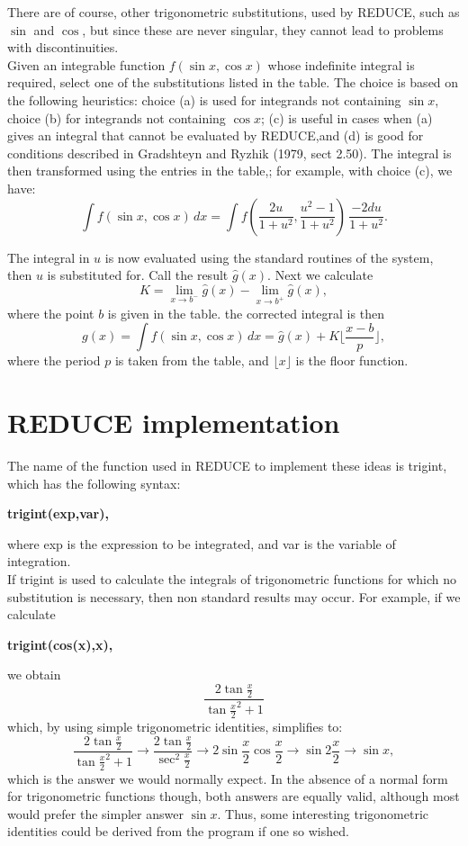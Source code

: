 There are of course, other trigonometric substitutions, used by \small{REDUCE}, \normalsize such as $\sin$ and $\cos$, but since these are never singular, they cannot lead to problems with discontinuities. \\
Given an integrable function $f(\sin x,\cos x)$ whose indefinite integral is required, select one of the substitutions listed in the table. The choice is based on the following heuristics: choice (a) is used for integrands not containing $\sin x$, choice (b) for integrands not containing $\cos x$; (c) is useful in cases when (a) gives an integral that cannot be evaluated by \small{REDUCE},\normalsize and (d) is good for conditions described in Gradshteyn and Ryzhik (1979, sect 2.50). The integral is then transformed using the entries in the table,; for example, with choice (c), we have:
\[ \int f(\sin x,\cos x)\, dx = \int f(\frac{2u}{1+u^{2}},\frac{u^{2}-1}{1+u^{2}})\,\frac{-2 du}{1+u^{2}} . \]

The integral in $u$ is now evaluated using the standard routines of the system, then $u$ is substituted for. Call the result $\hat{g}(x)$. Next we calculate
 \[ K=\lim_{x \rightarrow b^{-}} \hat{g}(x) - \lim_{x \rightarrow b^{+}} \hat{g}(x), \]
where the point $b$ is given in the table. the corrected integral is then
\[ g(x)=\int f(\sin x,\cos x)\,dx = \hat{g}(x)+K\lfloor \frac{x-b}{p} \rfloor, \]
where the period $p$ is taken from the table, and $\lfloor x \rfloor$ is the floor function.
\pagebreak
\section{REDUCE implementation}
The name of the function used in \small{REDUCE} \normalsize to implement these ideas is trigint, which has the following syntax:
\begin{center}  \bf{trigint(exp,var)}, \end{center}
where exp is the expression to be integrated, and var is the variable of integration.  \\
If trigint is used to calculate the integrals of trigonometric functions for which no substitution is necessary, then non standard results may occur. For example, if we calculate
  \begin{center} \bf{trigint(cos(x),x)}, \end{center}
we obtain \\
\[ \frac{2\tan\frac{x}{2}}{\tan\frac{x}{2}^{2}+1} \]
which, by using simple trigonometric identities, simplifies to: \\
\[  \frac{2\tan\frac{x}{2}}{\tan\frac{x}{2}^{2}+1} \rightarrow \frac{2\tan\frac{x}{2}}{\sec^{2}\frac{x}{2}} \rightarrow 2\sin\frac{x}{2}\cos\frac{x}{2} \rightarrow \sin 2\frac{x}{2} \rightarrow \sin x, \]
which is the answer we would normally expect. In the absence of a normal form for trigonometric functions though, both answers are equally valid, although most would prefer the simpler answer $\sin x.$ Thus, some interesting trigonometric identities could be derived from the program if one so wished. 
